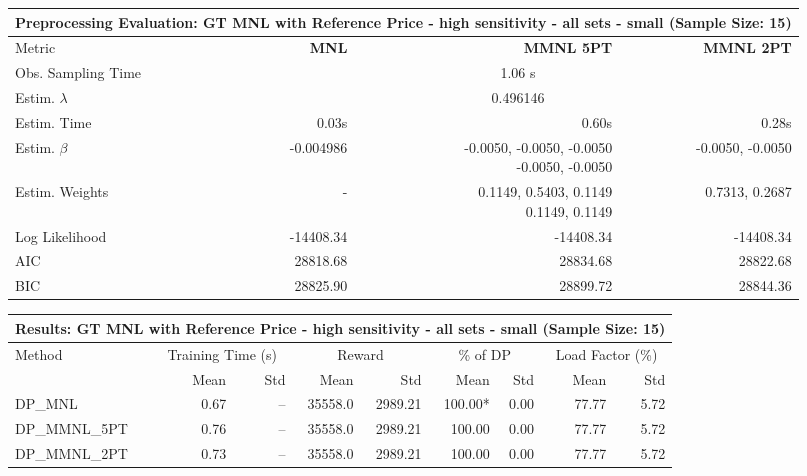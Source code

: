 
\begin{samepage}
\begin{center}
  \small
  \begin{tabular}{l|r|r|r}
    \toprule
    \multicolumn{4}{c}{\textbf{Preprocessing Evaluation: GT MNL with Reference Price - high sensitivity - all sets - small (Sample Size: 15)}} \\
    \midrule
    Metric & \textbf{MNL} & \textbf{MMNL 5PT} & \textbf{MMNL 2PT} \\
    \midrule
    Obs. Sampling Time & \multicolumn{3}{c}{1.06 s} \\
    Estim. $\lambda$ & \multicolumn{3}{c}{0.496146} \\
    Estim. Time & 0.03s & 0.60s & 0.28s \\
    Estim. $\beta$ & -0.004986 & \makecell[tr]{-0.0050, -0.0050, -0.0050 \\ -0.0050, -0.0050} & -0.0050, -0.0050 \\
    Estim. Weights & - & \makecell[tr]{0.1149, 0.5403, 0.1149 \\ 0.1149, 0.1149} & 0.7313, 0.2687 \\
    Log Likelihood & -14408.34 & -14408.34 & -14408.34 \\
    AIC & 28818.68 & 28834.68 & 28822.68 \\
    BIC & 28825.90 & 28899.72 & 28844.36 \\
    \bottomrule
  \end{tabular}
\end{center}
\begin{center}
  \small
  \begin{tabular}{l|rr|rr|rr|rr}
    \toprule
    \multicolumn{9}{c}{\textbf{Results: GT MNL with Reference Price - high sensitivity - all sets - small (Sample Size: 15)}} \\
    \midrule
    Method & \multicolumn{2}{c|}{Training Time (s)} & \multicolumn{2}{c|}{Reward} & \multicolumn{2}{c|}{\% of DP} & \multicolumn{2}{c}{Load Factor (\%)} \\
    & Mean & Std & Mean & Std & Mean & Std & Mean & Std \\
    \midrule
    DP\_MNL      &     0.67 &    -- &    35558.0 &    2989.21 & 100.00* &    0.00 &   77.77 &    5.72 \\
    DP\_MMNL\_5PT &     0.76 &    -- &    35558.0 &    2989.21 &  100.00 &    0.00 &   77.77 &    5.72 \\
    DP\_MMNL\_2PT &     0.73 &    -- &    35558.0 &    2989.21 &  100.00 &    0.00 &   77.77 &    5.72 \\

\end{tabular}
\end{center}
\end{samepage}

